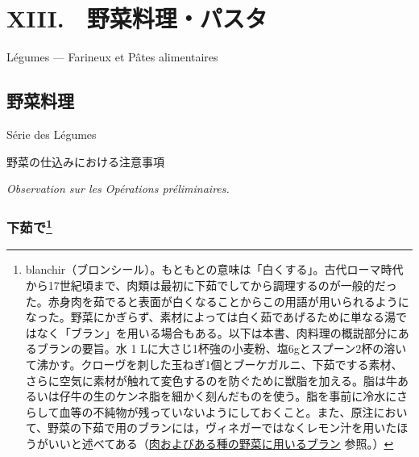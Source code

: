 \begin{main}

\hypertarget{legumes-farineux-et-pates-alimentaires}{%
\chapter{XIII.　野菜料理・パスタ}\label{legumes-farineux-et-pates-alimentaires}}

\begin{frchapenv}

Légumes --- Farineux et Pâtes alimentaires

\end{frchapenv}

\hypertarget{serie-des-legumes}{%
\section{野菜料理}\label{serie-des-legumes}}

\begin{frsecenv}

Série des Légumes

\end{frsecenv}

\begin{center}
\headfont\large 野菜の仕込みにおける注意事項\label{observations-sur-les-operations-preliminaires}

\normalfont\textit{Observation sur les Opérations préliminaires.}
\end{center}

\normalfont\normalsize

\hypertarget{blanchissage}{%
\subsection[下茹で]{\texorpdfstring{下茹で\footnote{blanchir（ブロンシール）。もともとの意味は「白くする」。古代ローマ時代から17世紀頃まで、肉類は最初に下茹でしてから調理するのが一般的だった。赤身肉を茹でると表面が白くなることからこの用語が用いられるようになった。野菜にかぎらず、素材によっては白く茹であげるために単なる湯ではなく「ブラン」を用いる場合もある。以下は本書、肉料理の概説部分にあるブランの要旨。水
  1
  Lに大さじ1杯強の小麦粉、塩6gとスプーン2杯の溶いて沸かす。クローヴを刺した玉ねぎ1個とブーケガルニ、下茹でする素材、さらに空気に素材が触れて変色するのを防ぐために獣脂を加える。脂は牛あるいは仔牛の生のケンネ脂を細かく刻んだものを使う。脂を事前に冷水にさらして血等の不純物が残っていないようにしておくこと。また、原注において、野菜の下茹で用のブランには，ヴィネガーではなくレモン汁を用いたほうがいいと述べてある（\protect\hyperlink{blanc-pour-viandes-et-certains-legumes}{肉およびある種の野菜に用いるブラン}
  参照。）}}{下茹で}}\label{blanchissage}}


\end{main}
